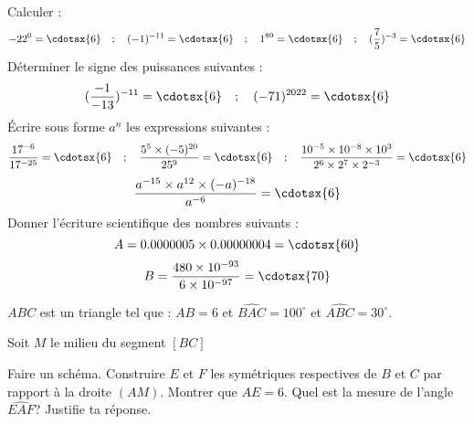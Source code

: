 \documentclass[a4paper,addpoints,12pt]{exam}
\begin{document}
\devoir[prv=false,ds=true,num=2 ,niv=2 , date=17/12/2022]

\begin{exo}[12]
\begin{questions}
\question[4] Calculer : 
\[
 -22^{0}=\cdotsx{6} \quad; \quad (-1)^{-11}=\cdotsx{6} \quad; \quad 1^{89}=\cdotsx{6} \quad; \quad (\dfrac{7}{5})^{-3}=\cdotsx{6}
\]
\question[2] Déterminer le signe des puissances suivantes :
\[ (\dfrac{-1}{-13})^{-11}=\cdotsx{6} \quad; \quad 
	(-71)^{2022}=\cdotsx{6}
\] 
\question[4] Écrire sous forme $a^{n}$ les expressions suivantes :
\[\dfrac{17^{-6}}{17^{-25}}=\cdotsx{6}\quad; \quad
	\dfrac{5^{5}\times (-5)^{20}}{25^{9}}=\cdotsx{6}\quad; \quad
	\dfrac{10^{-5}\times 10^{-8}\times 10^{3}}{2^{6}\times 2^{7}\times 2^{-3}}=\cdotsx{6}
\]
\[
\dfrac{a^{-15}\times a^{12}\times (-a)^{-18}}{a^{-6}}=\cdotsx{6}
\]
\question[2] Donner l'écriture scientifique des nombres suivants :
\[
	A=0.0000005\times 0.00000004=\cdotsx{60} 
\]
\[	
	B=\dfrac{480\times 10^{-93}}{6\times 10^{-97}}=\cdotsx{70}
\]
\end{questions}
\end{exo}

\begin{exo}[8]
$ABC$ est un triangle tel que : $AB=6$ et $\widehat{BAC}=100^{\circ}$ et $\widehat{ABC}=30^{\circ}$.

Soit $M$ le milieu du segment $[BC]$ 
\begin{questions}
\question[2] Faire un schéma.
\question Construire $E$ et $F$ les symétriques respectives   de $B$ et $C$ par rapport à la droite $(AM)$.
\question[2] Montrer que $AE=6$.
\question[2] Quel est la mesure de l'angle $\widehat{EAF}$? Justifie ta réponse.
\end{questions}
\end{exo}
\end{document}
